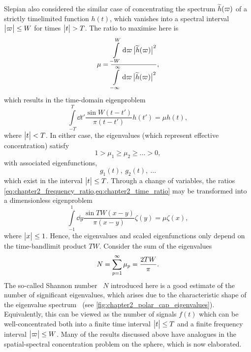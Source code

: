 Slepian \etal{} also considered the similar case of concentrating the spectrum \(\widetilde{h}(\varpi)\) of a strictly timelimited function \(h(t)\), which vanishes into a spectral interval \(\big\lvert\varpi\big\rvert \leq W\) for times \(\big\lvert t\big\rvert > T\).
The ratio to maximise here is
%
\begin{equation}\label{eq:chapter2_time_ratio}
    \mu
    = \frac{\displaystyle\int\limits_{-W}^{W} \dd{\varpi} \big\lvert\widetilde{h}(\varpi)\big\rvert^{2}}
    {\displaystyle\int\limits_{-\infty}^{\infty} \dd{\varpi} \big\lvert\widetilde{h}(\varpi)\big\rvert^{2}},
\end{equation}
%
which results in the time-domain eigenproblem
%
\begin{equation}\label{eq:chapter2_time_eigenproblem}
    \int\limits_{-T}^{T} \dd{t'} \frac{\sin{W(t-t')}}{\pi(t-t')} h(t')
    = \mu h(t),
\end{equation}
%
where \(\big\lvert t\big\rvert < T\).
In either case, the eigenvalues (which represent effective concentration) satisfy
%
\begin{equation}
    1 > \mu_{1} \geq \mu_{2} \geq \ldots > 0, %
\end{equation}
%
with associated eigenfunctions, \eg{}
%
\begin{equation}
    g_{1}(t),\ g_{2}(t),\ \ldots
\end{equation}
%
which exist in the interval \(\big\lvert t\big\rvert \leq T\).
Through a change of variables, the ratios \cref{eq:chapter2_frequency_ratio,eq:chapter2_time_ratio} may be transformed into a dimensionless eigenproblem
%
\begin{equation}
    \int\limits_{-1}^{1} \dd{y} \frac{\sin{TW(x-y)}}{\pi(x-y)} \zeta(y)
    = \mu \zeta(x),
\end{equation}
%
where \(\big\lvert x\big\rvert \leq 1\).
Hence, the eigenvalues and scaled eigenfunctions only depend on the time-bandlimit product \(TW\).
Consider the sum of the eigenvalues
%
\begin{equation}
    N
    = \sum\limits_{p=1}^{\infty} {\mu}_{p}
    = \frac{2TW}{\pi}.
\end{equation}
%
The so-called Shannon number~\cite{Percival1993} \(N\) introduced here is a good estimate of the number of significant eigenvalues, which arises due to the characteristic shape of the eigenvalue spectrum~\cite{Landau1965,Slepian1965} (see \cref{fig:chapter2_polar_cap_eigenvalues}).
Equivalently, this can be viewed as the number of signals \(f(t)\) which can be well-concentrated both into a finite time interval \(\big\lvert t\big\rvert \leq T\) and a finite frequency interval \(\big\lvert\varpi\big\rvert \leq W\).
Many of the results discussed above have analogues in the spatial-spectral concentration problem on the sphere, which is now elaborated.

